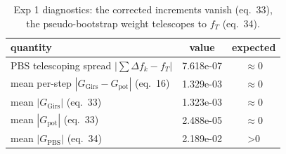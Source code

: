 \begin{table}[ht]
\centering
\caption{Exp 1 diagnostics: the corrected increments vanish (eq.~33), the pseudo-bootstrap weight telescopes to $f_T$ (eq.~34).}
\label{tab:toy_1_diag}
\begin{tabular}{lcc}
\toprule
quantity & value & expected \\
\midrule
PBS telescoping spread $|\sum\Delta f_k - f_T|$ & 7.618e-07 & $\approx 0$ \\
mean per-step $|G_{\mathrm{Girs}} - G_{\mathrm{pot}}|$ (eq.~16) & 1.329e-03 & $\approx 0$ \\
mean $|G_{\mathrm{Girs}}|$ (eq.~33) & 1.323e-03 & $\approx 0$ \\
mean $|G_{\mathrm{pot}}|$ (eq.~33) & 2.488e-05 & $\approx 0$ \\
mean $|G_{\mathrm{PBS}}|$ (eq.~34) & 2.189e-02 & >$0$ \\
\bottomrule
\end{tabular}
\end{table}
